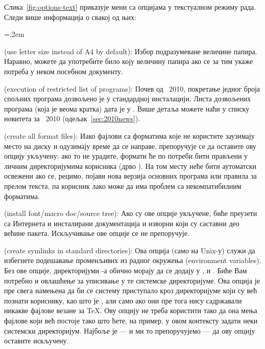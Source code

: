 \documentclass{article}
\begin{document}
Слика~\ref{fig:options-text} приказује мени са опцијама у текстуалном режиму
рада. Следи више информација о свакој од њих:

\begin{description}
\itemsep=.2em
\item[узети Letter као подразумевану величину папира уместо A4]
  (\textenglish{use letter size instead of A4 by de\-fault}): Избор
  подразумеване величине папира. Наравно, можете да употребите било
  коју величину папира ако се за тим укаже потреба у неком посебном
  документу.

\item[извршавање ограничене листе програма] (\textenglish{execution
  of restricted list of programs}): Почев од \TL\ 2010, покретање
  једног броја спољних програма дозвољено је у стандардној инсталацији.
  Листа дозвољених програма (која је веома кратка) дата је у
  . Више детаља можете наћи у списку новитета за
  \TL\ 2010 (одељак~\ref{sec:2010news}).

\item[направи све фајлове са форматима] (\textenglish{create all format
  files}): Иако фајлови са форматима које не користите заузимају место
  на диску и одузимају време да се направе, препоручује се да оставите
  ову опцију укључену: ако то не урадите, формати ће по потреби бити
  прављени у личним директоријумима корисника (дрво ).
  На том месту неће бити аутоматски освежени ако се, рецимо, појави
  нова верзија основних програма или правила за прелом текста, па 
  корисник лако може да има проблем са некомпатибилним форматима.

\item[инсталирај изворни \tmpbox{ко\char"0302 д} и документацију фонтова и макроа]
  (\textenglish{install font/macro doc/source tree}): Ако су ове опције
  укључене, биће преузети са Интернета и инсталирани документација и
  изворни  који су саставни део већине пакета.
  Искључивање ове опције се не препоручује.

\item[направи симболичке линкове у системским директоријумима]
  (\textenglish{create symlinks in standard directories}): Ова опција
  (само на Unix-у) служи да избегнете подешавање променљивих из
  радног окружења (\textenglish{environment variables}). Без ове опције,
  директоријуми \TL{}-а обично морају да се додају у ,
   и . Биће Вам потребно и овлашћење
  за уписивање у те системске директоријуме. Ова опција је пре свега
  намењена да би се \TL{} систему приступало кроз директоријуме који су
  већ познати кориснику, као што је , али само
  ако они пре тога нису садржавали никакве фајлове везане за \TeX.
  Ову опцију не треба користити тако да она мења фајлове који већ
  постоје тако што ћете, на пример, у овом контексту задати неки
  системски директоријум. Најбоље је --- и ми то препоручујемо --- да
  ову опцију оставите искључену.


\end{description}
\end{document}
